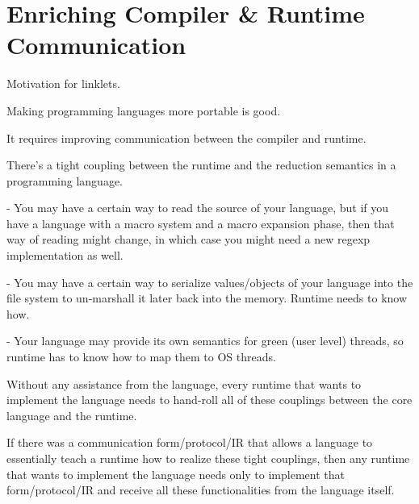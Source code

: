 

	\section[\texorpdfstring{Enriching Compiler \& Runtime Communication}{Motivation for Linklets}]{Enriching Compiler \& Runtime Communication}

		\begin{mainpoint}
			Motivation for linklets.

			Making programming languages more portable is good.

			It requires improving communication between the compiler and runtime.
		\end{mainpoint}

		\begin{paragraph-here}
			There's a tight coupling between the runtime and the reduction semantics in a programming language.

				- You may have a certain way to read the source of your language, but if you have a language with a macro system and a macro expansion phase, then that way of reading might change, in which case you might need a new regexp implementation as well.

				- You may have a certain way to serialize values/objects of your language into the file system to un-marshall it later back into the memory. Runtime needs to know how.

				- Your language may provide its own semantics for green (user level) threads, so runtime has to know how to map them to OS threads.
		\end{paragraph-here}

		\begin{paragraph-here}
			Without any assistance from the language, every runtime that wants to implement the language needs to hand-roll all of these couplings between the core language and the runtime.
		\end{paragraph-here}

		\begin{paragraph-here}
			 If there was a communication form/protocol/IR that allows a language to essentially teach a runtime how to realize these tight couplings, then any runtime that wants to implement the language needs only to implement that form/protocol/IR and receive all these functionalities from the language itself.
		\end{paragraph-here}

